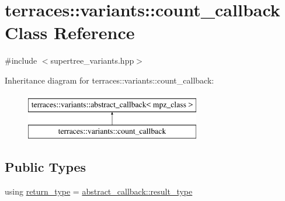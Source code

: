 \hypertarget{classterraces_1_1variants_1_1count__callback}{}\section{terraces\+:\+:variants\+:\+:count\+\_\+callback Class Reference}
\label{classterraces_1_1variants_1_1count__callback}


{\ttfamily \#include $<$supertree\+\_\+variants.\+hpp$>$}

Inheritance diagram for terraces\+:\+:variants\+:\+:count\+\_\+callback\+:\begin{figure}[H]
\begin{center}
\leavevmode
\includegraphics[height=2.000000cm]{classterraces_1_1variants_1_1count__callback}
\end{center}
\end{figure}
\subsection*{Public Types}
\begin{DoxyCompactItemize}
\item 
using \hyperlink{classterraces_1_1variants_1_1count__callback_adb8cc586b7f8d5aeaa4d1d83c36c5cb8}{return\+\_\+type} = \hyperlink{classterraces_1_1variants_1_1abstract__callback_ac1da94f0be306068e89627dc40cd0f3b}{abstract\+\_\+callback\+::result\+\_\+type}
\end{DoxyCompactItemize}
